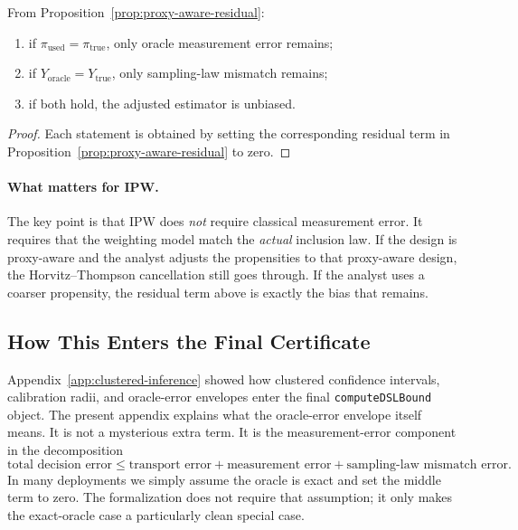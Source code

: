 \begin{corollary}
\label{cor:proxy-aware-special-cases}
From Proposition~\ref{prop:proxy-aware-residual}:
\begin{enumerate}[nosep]
    \item if $\pi_{\mathrm{used}}=\pi_{\mathrm{true}}$, only oracle
    measurement error remains;
    \item if $Y_{\mathrm{oracle}}=Y_{\mathrm{true}}$, only sampling-law
    mismatch remains;
    \item if both hold, the adjusted estimator is unbiased.
\end{enumerate}
\end{corollary}

\begin{proof}
Each statement is obtained by setting the corresponding residual term in
Proposition~\ref{prop:proxy-aware-residual} to zero.
\end{proof}

\paragraph{What matters for IPW.}
The key point is that IPW does \emph{not} require classical measurement error.
It requires that the weighting model match the \emph{actual} inclusion law. If
the design is proxy-aware and the analyst adjusts the propensities to that
proxy-aware design, the Horvitz--Thompson cancellation still goes through. If
the analyst uses a coarser propensity, the residual term above is exactly the
bias that remains.

\subsection{How This Enters the Final Certificate}

Appendix~\ref{app:clustered-inference} showed how clustered confidence
intervals, calibration radii, and oracle-error envelopes enter the final
\texttt{computeDSLBound} object. The present appendix explains what the
oracle-error envelope itself means. It is not a mysterious extra term. It is
the measurement-error component in the decomposition
\[
\text{total decision error}
\le
\text{transport error}
+
\text{measurement error}
+
\text{sampling-law mismatch error}.
\]
In many deployments we simply assume the oracle is exact and set the middle
term to zero. The formalization does not require that assumption; it only makes
the exact-oracle case a particularly clean special case.
